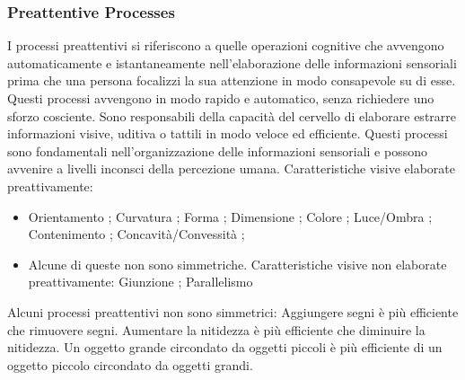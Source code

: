 \subsubsection{Preattentive Processes}

I processi preattentivi si riferiscono a quelle operazioni cognitive che avvengono automaticamente e
 istantaneamente nell'elaborazione delle informazioni sensoriali prima che una persona focalizzi la sua attenzione in modo consapevole su di esse. 
 Questi processi avvengono in modo rapido e automatico, senza richiedere uno sforzo cosciente.
Sono responsabili della capacità del cervello di elaborare estrarre informazioni visive, uditiva o tattili in modo veloce ed efficiente. Questi processi sono fondamentali nell'organizzazione delle informazioni sensoriali e possono avvenire a livelli inconsci della percezione umana.
Caratteristiche visive elaborate preattivamente:
\begin{itemize}
    \item Orientamento ; Curvatura ; Forma ; Dimensione ; Colore ;
    Luce/Ombra ; Contenimento ; Concavità/Convessità ;
    \item Alcune di queste non sono simmetriche.
        Caratteristiche visive non elaborate preattivamente:
        Giunzione ; Parallelismo
\end{itemize}
Alcuni processi preattentivi non sono simmetrici:
Aggiungere segni è più efficiente che rimuovere segni.
Aumentare la nitidezza è più efficiente che diminuire la nitidezza.
Un oggetto grande circondato da oggetti piccoli è più efficiente di un oggetto piccolo circondato da oggetti grandi.

